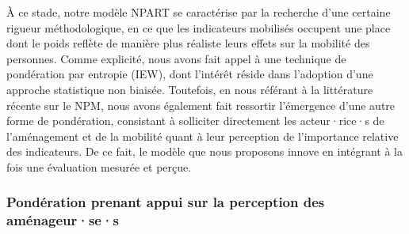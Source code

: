 \begin{refsegment}
À ce stade, notre modèle \acrshort{NPART} se caractérise par la recherche d'une certaine rigueur méthodologique, en ce que les indicateurs mobilisés occupent une place dont le poids reflète de manière plus réaliste leurs effets sur la mobilité des personnes. Comme explicité, nous avons fait appel à une technique de pondération par entropie (\acrshort{IEW}), dont l'intérêt réside dans l'adoption d'une approche statistique non biaisée. Toutefois, en nous référant à la littérature récente sur le \acrshort{NPM}, nous avons également fait ressortir l'émergence d'une autre forme de pondération, consistant à solliciter directement les acteur·rice·s de l'aménagement et de la mobilité quant à leur \gls{perception} de l'importance relative des indicateurs. De ce fait, le modèle que nous proposons innove en intégrant à la fois une évaluation mesurée et perçue.%

\subsubsection*{Pondération prenant appui sur la perception des aménageur·se·s
    \label{chap6:ponderation-subjective}
    }


\end{refsegment}
